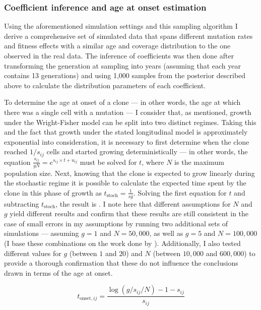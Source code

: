 \subsubsection{Coefficient inference and age at onset estimation}

Using the aforementioned simulation settings and this sampling algorithm I derive a comprehensive set of simulated data that spans different mutation rates and fitness effects with a similar age and coverage distribution to the one observed in the real data. The inference of coefficients was then done after transforming the generation at sampling into years (assuming that each year contains 13 generations) and using 1,000 samples from the posterior described above to calculate the distribution parameters of each coefficient. 

To determine the age at onset of a clone --- in other words, the age at which there was a single cell with a mutation --- I consider that, as mentioned, growth under the Wright-Fisher model can be split into two distinct regimes. Taking this and the fact that growth under the stated longitudinal model is approximately exponential into consideration, it is necessary to first determine when the clone reached $1/s_{ij}$ cells and started growing deterministically --- in other words, the equation $\frac{s_{ij}}{gN} = e^{s_{ij} \times t + u_{ij}}$ must be solved for $t$, where $N$ is the maximum population size. Next, knowing that the clone is expected to grow linearly during the stochastic regime it is possible to calculate the expected time spent by the clone in this phase of growth as $t_{\mathrm{stoch}} = \frac{1}{sg}$. Solving the first equation for $t$ and subtracting $t_{\mathrm{stoch}}$, the result is . I note here that different assumptions for $N$ and $g$ yield different results and confirm that these results are still consistent in the case of small errors in my assumptions by running two additional sets of simulations --- assuming $g=1$ and $N=50,000$, as well as $g=5$ and $N=100,000$ (I base these combinations on the work done by  \cite{Lee-Six2018-lp}). Additionally, I also tested different values for $g$ (between $1$ and $20$) and $N$ (between $10,000$ and $600,000$) to provide a thorough confirmation that these do not influence the conclusions drawn in terms of the age at onset.

\begin{equation}\label{eq:t-onset}
	t_{\mathrm{onset},ij} = \frac{\log(g/s_{ij}/N)-1-s_{ij}}{s_{ij}}
\end{equation}

